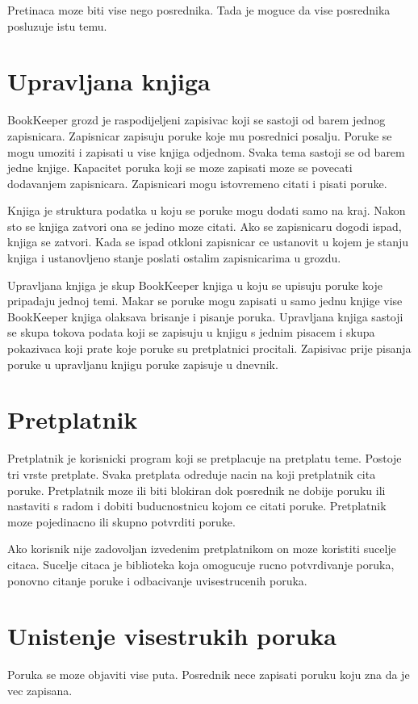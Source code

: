 \documentclass[times, utf8, diplomski, numeric]{fer}
\begin{document}
Pretinaca moze biti vise nego posrednika. Tada je moguce da vise posrednika posluzuje istu temu.



\chapter{Upravljana knjiga}
BookKeeper grozd je raspodijeljeni zapisivac koji se sastoji od barem jednog zapisnicara. Zapisnicar zapisuju poruke koje mu posrednici posalju. Poruke se mogu umoziti i zapisati u vise knjiga odjednom. Svaka tema sastoji se od barem jedne knjige. Kapacitet poruka koji se moze zapisati moze se povecati dodavanjem zapisnicara. Zapisnicari mogu istovremeno citati i pisati poruke. 

Knjiga je struktura podatka u koju se poruke mogu dodati samo na kraj. Nakon sto se knjiga zatvori ona se jedino moze citati. Ako se zapisnicaru dogodi ispad, knjiga se zatvori. Kada se ispad otkloni zapisnicar ce ustanovit u kojem je stanju knjiga i ustanovljeno stanje poslati ostalim zapisnicarima u grozdu. 

Upravljana knjiga je skup BookKeeper knjiga u koju se upisuju poruke koje pripadaju jednoj temi. Makar se poruke mogu zapisati u samo jednu knjige vise BookKeeper knjiga olaksava brisanje i pisanje poruka. Upravljana knjiga sastoji se skupa tokova podata koji se zapisuju u knjigu s jednim pisacem i skupa pokazivaca koji prate koje poruke su pretplatnici procitali. Zapisivac prije pisanja poruke u upravljanu knjigu poruke zapisuje u dnevnik.


\chapter{Pretplatnik}
Pretplatnik je korisnicki program koji se pretplacuje na pretplatu teme. Postoje tri vrste pretplate. Svaka pretplata odreduje nacin na koji pretplatnik cita poruke. Pretplatnik moze ili biti blokiran dok posrednik ne dobije poruku ili nastaviti s radom i dobiti buducnostnicu kojom ce citati poruke. Pretplatnik moze pojedinacno ili skupno potvrditi poruke.

Ako korisnik nije zadovoljan izvedenim pretplatnikom on moze koristiti sucelje citaca. Sucelje citaca je biblioteka koja omogucuje rucno potvrdivanje poruka, ponovno citanje poruke i odbacivanje uvisestrucenih poruka.



\chapter{Unistenje visestrukih poruka}
Poruka se moze objaviti vise puta. Posrednik nece zapisati poruku koju zna da je vec zapisana.
\end{document}
